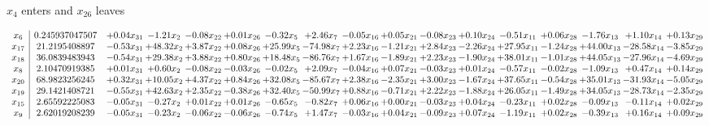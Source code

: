 \documentclass[9pt]{article}
\begin{document}
 $ x_{4} $ enters and $ x_{26} $ leaves 

 \[\begin{array}{c| c c@{\hskip 2pt} c@{\hskip 2pt} c@{\hskip 2pt} c@{\hskip 2pt} c@{\hskip 2pt} c@{\hskip 2pt} c@{\hskip 2pt} c@{\hskip 2pt} c@{\hskip 2pt} c@{\hskip 2pt} c@{\hskip 2pt} c@{\hskip 2pt} c@{\hskip 2pt} c@{\hskip 2pt} c@{\hskip 2pt} }
 x_{6}   &  0.245937047507 & +  0.04 x_{31} & -1.21 x_{2} & -0.08 x_{22} & +  0.01 x_{26} & -0.32 x_{5} & +  2.46 x_{7} & -0.05 x_{16} & +  0.05 x_{21} & -0.08 x_{23} & +  0.10 x_{24} & -0.51 x_{11} & +  0.06 x_{28} & -1.76 x_{13} & +  1.10 x_{14} & +  0.13 x_{29}\\
 x_{17}   &  21.2195408897 & -0.53 x_{31} & + 48.32 x_{2} & +  3.87 x_{22} & +  0.08 x_{26} & + 25.99 x_{5} & -74.98 x_{7} & +  2.23 x_{16} & -1.21 x_{21} & +  2.84 x_{23} & -2.26 x_{24} & + 27.95 x_{11} & -1.24 x_{28} & + 44.00 x_{13} & -28.58 x_{14} & -3.85 x_{29}\\
 x_{18}   &  36.0839483943 & -0.54 x_{31} & + 29.38 x_{2} & +  3.88 x_{22} & +  0.80 x_{26} & + 18.48 x_{5} & -86.76 x_{7} & +  1.67 x_{16} & -1.89 x_{21} & +  2.23 x_{23} & -1.90 x_{24} & + 38.01 x_{11} & -1.01 x_{28} & + 44.05 x_{13} & -27.96 x_{14} & -4.69 x_{29}\\
 x_{8}   &  2.10470919385 & +  0.01 x_{31} & +  0.60 x_{2} & -0.08 x_{22} & -0.03 x_{26} & -0.02 x_{5} & +  2.09 x_{7} & -0.04 x_{16} & +  0.07 x_{21} & -0.03 x_{23} & +  0.01 x_{24} & -0.57 x_{11} & -0.02 x_{28} & -1.09 x_{13} & +  0.47 x_{14} & +  0.14 x_{29}\\
 x_{20}   &  68.9823256245 & +  0.32 x_{31} & + 10.05 x_{2} & +  4.37 x_{22} & +  0.84 x_{26} & + 32.08 x_{5} & -85.67 x_{7} & +  2.38 x_{16} & -2.35 x_{21} & +  3.00 x_{23} & -1.67 x_{24} & + 37.65 x_{11} & -0.54 x_{28} & + 35.01 x_{13} & -31.93 x_{14} & -5.05 x_{29}\\
 x_{19}   &  29.1421408721 & -0.55 x_{31} & + 42.63 x_{2} & +  2.35 x_{22} & -0.38 x_{26} & + 32.40 x_{5} & -50.99 x_{7} & +  0.88 x_{16} & -0.71 x_{21} & +  2.22 x_{23} & -1.88 x_{24} & + 26.05 x_{11} & -1.49 x_{28} & + 34.05 x_{13} & -28.73 x_{14} & -2.35 x_{29}\\
 x_{15}   &  2.65592225083 & -0.05 x_{31} & -0.27 x_{2} & +  0.01 x_{22} & +  0.01 x_{26} & -0.65 x_{5} & -0.82 x_{7} & +  0.06 x_{16} & +  0.00 x_{21} & -0.03 x_{23} & +  0.04 x_{24} & -0.23 x_{11} & +  0.02 x_{28} & -0.09 x_{13} & -0.11 x_{14} & +  0.02 x_{29}\\
 x_{9}   &  2.62019208239 & -0.05 x_{31} & -0.23 x_{2} & -0.06 x_{22} & -0.06 x_{26} & -0.74 x_{5} & +  1.47 x_{7} & -0.03 x_{16} & +  0.04 x_{21} & -0.09 x_{23} & +  0.07 x_{24} & -1.19 x_{11} & +  0.02 x_{28} & -0.39 x_{13} & +  0.16 x_{14} & +  0.09 x_{29}\\

\end{array}\]
\end{document}
